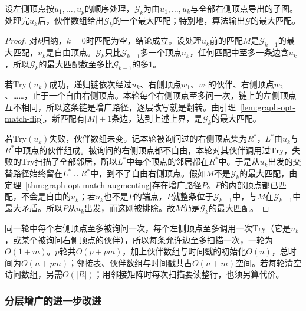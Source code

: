\begin{theorem}[匈牙利算法的正确性]
设左侧顶点按$u_1,\ldots,u_p$的顺序处理，$\mathcal G_k$为由$u_1,\ldots,u_k$与全部右侧顶点导出的子图。处理完$u_k$后，伙伴数组给出$\mathcal G_k$的一个最大匹配；特别地，算法输出$\mathcal G$的最大匹配。
\end{theorem}

\begin{proof}
对$k$归纳，$k=0$时匹配为空，结论成立。设处理$u_k$前的匹配$M$是$\mathcal G_{k-1}$的最大匹配，$u_k$是自由顶点。$\mathcal G_k$只比$\mathcal G_{k-1}$多一个顶点$u_k$，任何匹配中至多一条边含$u_k$，所以$\mathcal G_k$的最大匹配数至多比$\mathcal G_{k-1}$的多$1$。

若$\mathrm{Try}(u_k)$成功，递归链依次经过$u_k$、右侧顶点$w_1$、$w_1$的伙伴、右侧顶点$w_2$、……，止于一个自由右侧顶点。本轮每个右侧顶点至多问一次，链上的左侧顶点互不相同，所以这条链是增广路径，逐层改写就是翻转。由引理~\ref{lem:graph-opt-match-flip}，新匹配有$|M|+1$条边，达到上述上界，是$\mathcal G_k$的最大匹配。

若$\mathrm{Try}(u_k)$失败，伙伴数组未变。记本轮被询问过的右侧顶点集为$R^*$，$L^*$由$u_k$与$R^*$中顶点的伙伴组成。被询问的右侧顶点都不自由，本轮对其伙伴调用过$\mathrm{Try}$，失败的$\mathrm{Try}$扫描了全部邻居，所以$L^*$中每个顶点的邻居都在$R^*$中。于是从$u_k$出发的交替路径始终留在$L^*\cup R^*$中，到不了自由右侧顶点。假如$M$不是$\mathcal G_k$的最大匹配，由定理~\ref{thm:graph-opt-match-augmenting}存在增广路径$P$。$P$的内部顶点都已匹配，不会是自由的$u_k$；若$u_k$也不是$P$的端点，$P$就整条位于$\mathcal G_{k-1}$中，与$M$在$\mathcal G_{k-1}$中最大矛盾。所以$P$从$u_k$出发，而这刚被排除。故$M$仍是$\mathcal G_k$的最大匹配。
\end{proof}

同一轮中每个右侧顶点至多被询问一次，每个左侧顶点至多调用一次$\mathrm{Try}$（它是$u_k$，或某个被询问右侧顶点的伙伴），所以每条允许边至多扫描一次，一轮为$O(1+m)$。$p$轮共$O(p+pm)$，加上伙伴数组与时间戳的初始化$O(n)$，总时间为$O(n+pm)$；邻接表、伙伴数组与时间戳共占$O(n+m)$空间。若每轮清空访问数组，另需$O(|R|)$；用邻接矩阵时每次扫描要读整行，也须另算代价。

\subsubsection{分层增广的进一步改进}
\label{sec:graph-opt-hopcroft-karp}

